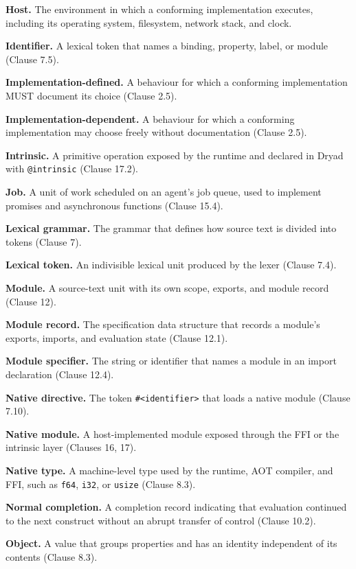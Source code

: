 \documentclass[
  english,
  11pt,
  a4paper,
]{article}
\begin{document}
\textbf{Host.} The environment in which a conforming implementation
executes, including its operating system, filesystem, network stack, and
clock.

\textbf{Identifier.} A lexical token that names a binding, property,
label, or module (Clause 7.5).

\textbf{Implementation-defined.} A behaviour for which a conforming
implementation MUST document its choice (Clause 2.5).

\textbf{Implementation-dependent.} A behaviour for which a conforming
implementation may choose freely without documentation (Clause 2.5).

\textbf{Intrinsic.} A primitive operation exposed by the runtime and
declared in Dryad with \texttt{@intrinsic} (Clause 17.2).

\textbf{Job.} A unit of work scheduled on an agent's job queue, used to
implement promises and asynchronous functions (Clause 15.4).

\textbf{Lexical grammar.} The grammar that defines how source text is
divided into tokens (Clause 7).

\textbf{Lexical token.} An indivisible lexical unit produced by the
lexer (Clause 7.4).

\textbf{Module.} A source-text unit with its own scope, exports, and
module record (Clause 12).

\textbf{Module record.} The specification data structure that records a
module's exports, imports, and evaluation state (Clause 12.1).

\textbf{Module specifier.} The string or identifier that names a module
in an import declaration (Clause 12.4).

\textbf{Native directive.} The token
\texttt{\#\textless{}identifier\textgreater{}} that loads a native
module (Clause 7.10).

\textbf{Native module.} A host-implemented module exposed through the
FFI or the intrinsic layer (Clauses 16, 17).

\textbf{Native type.} A machine-level type used by the runtime, AOT
compiler, and FFI, such as \texttt{f64}, \texttt{i32}, or \texttt{usize}
(Clause 8.3).

\textbf{Normal completion.} A completion record indicating that
evaluation continued to the next construct without an abrupt transfer of
control (Clause 10.2).

\textbf{Object.} A value that groups properties and has an identity
independent of its contents (Clause 8.3).
\end{document}
